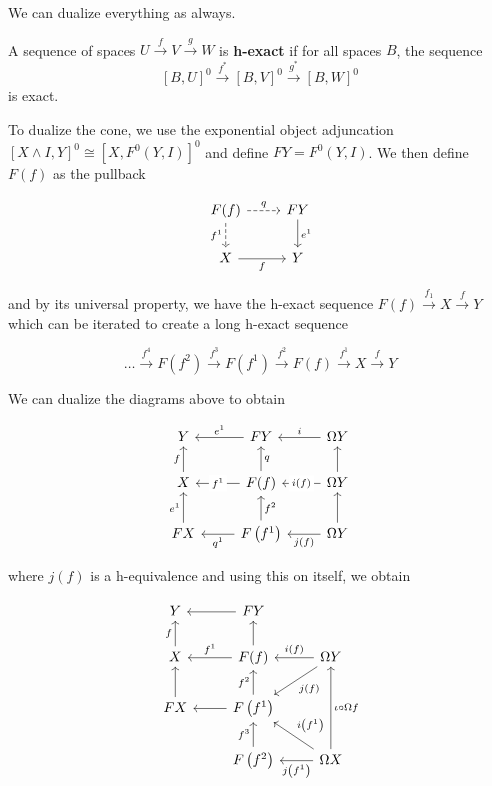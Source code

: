 \documentclass[12pt]{article}
\begin{document}
We can dualize everything as always.

A sequence of spaces $U\overset f\to V\overset g\to W$ is \textbf{h-exact} if for all spaces $B$, the sequence
\[[B,U]^0\overset{f^*}\to[B,V]^0\overset{g^*}\to[B,W]^0\]
is exact.

To dualize the cone, we use the exponential object adjuncation $\left[X\wedge I,Y\right]^0\cong\left[X,F^0(Y,I)\right]^0$ and define $FY=F^0(Y,I)$. We then define $F(f)$ as the pullback

\[\begin{tikzcd}
	{F(f)} & FY \\
	X & Y
	\arrow["f"', from=2-1, to=2-2]
	\arrow["{e^1}", from=1-2, to=2-2]
	\arrow["{f^1}"', dashed, from=1-1, to=2-1]
	\arrow["q", dashed, from=1-1, to=1-2]
\end{tikzcd}\]

and by its universal property, we have the h-exact sequence $F(f)\overset{f_1}\to X\overset f\to Y$ which can be iterated to create a long h-exact sequence

\[\dots\overset{f^4}\to F\left(f^2\right)\overset{f^3}\to F\left(f^1\right)\overset{f^2}\to F(f)\overset{f^1}\to X\overset f\to Y\]

We can dualize the diagrams above to obtain

\[\begin{tikzcd}
	Y & FY & {\Omega Y} \\
	X & {F(f)} & {\Omega Y} \\
	FX & {F\left(f^1\right)} & {\Omega Y}
	\arrow["{e^1}"', from=1-2, to=1-1]
	\arrow["f", from=2-1, to=1-1]
	\arrow["{f^1}"{description}, from=2-2, to=2-1]
	\arrow["q"', from=2-2, to=1-2]
	\arrow["i"', from=1-3, to=1-2]
	\arrow["{e^1}", from=3-1, to=2-1]
	\arrow["{f^2}"', from=3-2, to=2-2]
	\arrow["{q^1}", from=3-2, to=3-1]
	\arrow["{i(f)}"{description}, from=2-3, to=2-2]
	\arrow[from=2-3, to=1-3]
	\arrow[from=3-3, to=2-3]
	\arrow["{j(f)}", from=3-3, to=3-2]
\end{tikzcd}\]

where $j(f)$ is a h-equivalence and using this on itself, we obtain

\[\begin{tikzcd}
	Y & FY \\
	X & {F(f)} & {\Omega Y} \\
	FX & {F\left(f^1\right)} \\
	& {F\left(f^2\right)} & {\Omega X}
	\arrow[from=1-2, to=1-1]
	\arrow["f", from=2-1, to=1-1]
	\arrow["{f^1}"', from=2-2, to=2-1]
	\arrow[from=2-2, to=1-2]
	\arrow[from=3-1, to=2-1]
	\arrow["{f^2}", from=3-2, to=2-2]
	\arrow[from=3-2, to=3-1]
	\arrow["{i(f)}"', from=2-3, to=2-2]
	\arrow["{i\left(f^1\right)}"', from=4-3, to=3-2]
	\arrow["{j(f)}", from=2-3, to=3-2]
	\arrow["{f^3}", from=4-2, to=3-2]
	\arrow["{j\left(f^1\right)}", from=4-3, to=4-2]
	\arrow["{\iota\circ\Omega f}"', from=4-3, to=2-3]
\end{tikzcd}\]
\end{document}
